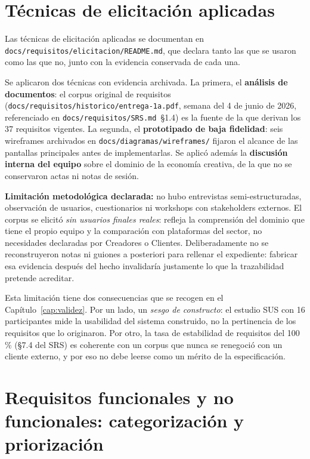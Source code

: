 \section{Técnicas de elicitación aplicadas}

Las técnicas de elicitación aplicadas se documentan en
\texttt{docs/requisitos/elicitacion/README.md}, que declara tanto las que
se usaron como las que no, junto con la evidencia conservada de cada una.

Se aplicaron dos técnicas con evidencia archivada. La primera, el
\textbf{análisis de documentos}: el corpus original de requisitos
(\texttt{docs/requisitos/historico/entrega-1a.pdf}, semana del 4 de junio
de 2026, referenciado en \texttt{docs/requisitos/SRS.md}~\S1.4) es la
fuente de la que derivan los
37 requisitos vigentes. La segunda, el \textbf{prototipado de baja
fidelidad}: seis wireframes archivados en
\texttt{docs/diagramas/wireframes/} fijaron el alcance de las pantallas
principales antes de implementarlas. Se aplicó además la
\textbf{discusión interna del equipo} sobre el dominio de la economía
creativa, de la que no se conservaron actas ni notas de sesión.

\textbf{Limitación metodológica declarada:} no hubo entrevistas
semi-estructuradas, observación de usuarios, cuestionarios ni workshops
con stakeholders externos. El corpus se elicitó \emph{sin usuarios
finales reales}: refleja la comprensión del dominio que tiene el propio
equipo y la comparación con plataformas del sector, no necesidades
declaradas por Creadores o Clientes. Deliberadamente no se reconstruyeron
notas ni guiones a posteriori para rellenar el expediente: fabricar esa
evidencia después del hecho invalidaría justamente lo que la trazabilidad
pretende acreditar.

Esta limitación tiene dos consecuencias que se recogen en el
Capítulo~\ref{cap:validez}. Por un lado, un \emph{sesgo de constructo}:
el estudio SUS con 16 participantes mide la usabilidad del sistema
construido, no la pertinencia de los requisitos que lo originaron. Por
otro, la tasa de estabilidad de requisitos del 100\,\% (\S7.4 del SRS) es
coherente con un corpus que nunca se renegoció con un cliente externo, y
por eso no debe leerse como un mérito de la especificación.

\section{Requisitos funcionales y no funcionales: categorización y priorización}

